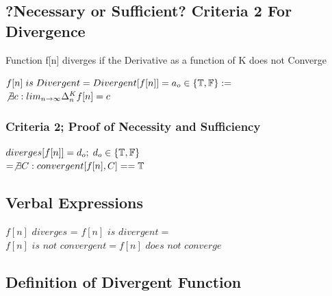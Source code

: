 \documentclass[11pt]{article}
\begin{document}
\subsection{?Necessary or Sufficient? Criteria 2 For Divergence}
Function f[n] diverges if the Derivative as a function of K does not Converge
\begin{center}
\vspace{2mm}
$
f[n]\hspace{1mm} is \hspace{1mm} Divergent = Divergent[f[n]] = a_o \in \{\mathbb{T},\mathbb{F}\} :=
$
\\ \vspace{4mm}
$
\not \exists c: lim_{n\rightarrow \infty} \Delta_n^K f[n] = c
$
\end{center}








\subsubsection{Criteria 2; Proof of Necessity and Sufficiency}
\begin{center}
$
diverges \lbrack f \lbrack n \rbrack \rbrack = d_o; \hspace{1mm} d_o \in \{\mathbb{T},\mathbb{F}\}
$
\\ \vspace{4mm}
$
= \not \exists C : convergent[f[n],C] == \mathbb{T}
$
\end{center}






\subsection{Verbal Expressions}
\begin{center}
\vspace{1mm}
$
f[n]$ $diverges$ = $f[n]$ $is$ $divergent =
$
\\ \vspace{2mm}
$
f[n]$ $is$ $not$ $convergent= f[n]$ $does$ $not$ $converge
$
\end{center}

\subsection{Definition of Divergent Function}
\end{document}
